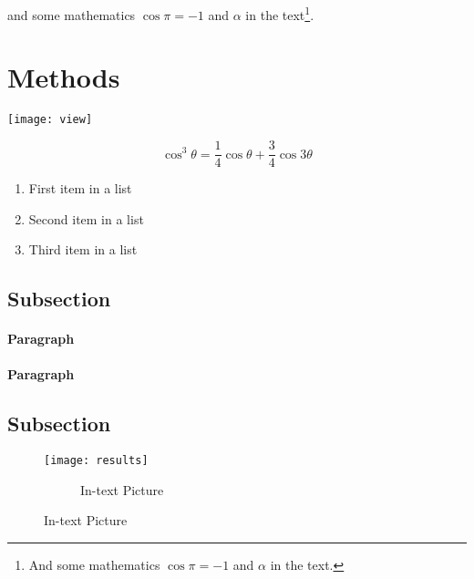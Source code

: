 
\lipsum[1-3] %
 and some mathematics $\cos\pi=-1$ and $\alpha$ in the text\footnote{And some mathematics $\cos\pi=-1$ and $\alpha$ in the text.}.



\section{Methods}

\begin{figure*}[ht]\centering %
    \texttt{[image: view]}
    \caption{Wide Picture}
	\label{fig:view}
    \end{figure*}

\lipsum[4] %

\begin{equation}
	\cos^3 \theta =\frac{1}{4}\cos\theta+\frac{3}{4}\cos 3\theta
	\label{eq:refname2}
\end{equation}

\lipsum[5] %

\begin{enumerate}[noitemsep] %
    \begin{enumerate}[noitemsep]
        \item First item in a list
        \item Second item in a list
        \item Third item in a list
    \end{enumerate}
\end{enumerate}


\subsection{Subsection}

\lipsum[6] %


\paragraph{Paragraph} \lipsum[7] %


\paragraph{Paragraph} \lipsum[8] %


\subsection{Subsection}

\lipsum[9] %

\begin{figure}[ht]\centering
	\texttt{[image: results]}
	\begin{figure}
		\caption{In-text Picture}
	\end{figure}
	\label{fig:results}
\end{figure}
